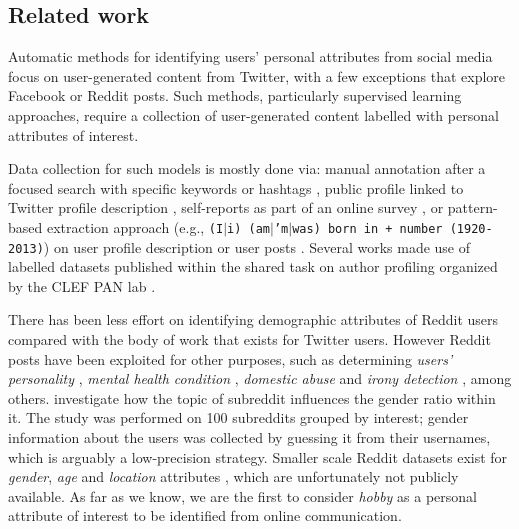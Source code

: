 \subsection{Related work}

Automatic methods for identifying users' personal attributes 
from social media focus on user-generated content from Twitter, with a few exceptions that explore Facebook \cite{sap:EMNLP14,Schwartz2013PersonalityGA} or Reddit \cite{fabian2015privacy,finlay2014age,gjurkovic-EtAl:2018} posts.
Such methods, particularly supervised learning approaches, require a collection of user-generated content labelled with personal attributes of interest.

Data collection for such models is mostly done via: manual annotation after a focused search with specific keywords or hashtags \cite{pietro:ACL15,Rao:2010}, public profile linked to Twitter profile description \cite{burger:EMNLP11,flekova:ACL16:long}, self-reports as part of an online survey \cite{finlay2014age,flekova:ACL16:long,pietro:ACL17:long,pietro:COLING18,sap:EMNLP14,schwartz2013personality}, or pattern-based extraction approach 
(e.g., \texttt{\small(I$|$i) (am$|$'m$|$was) born in + number (1920-2013)}) on user profile description or user posts \cite{fabian2015privacy,kim:ACL17:short,sloan2015tweets,tigunova2019listening}.
Several works \cite{basile:2017,bayot:MOD17} made use of labelled datasets published within the shared task on author profiling organized by the CLEF PAN lab \cite{stein:2017o,stein:2017l}. 

There has been less effort on identifying demographic attributes of Reddit users compared with the body of work that exists for Twitter users. However Reddit posts have been exploited for other purposes, such as determining \emph{users' personality} \cite{gjurkovic-EtAl:2018}, \emph{mental health condition} \cite{cohan2018smhd}, \emph{domestic abuse} \cite{schrading2015analysis} and \emph{irony detection} \cite{wallace2014humans}, among others.
\citet{thelwall2018she} investigate how the topic of subreddit influences the gender ratio within it. The study was performed on 100 subreddits grouped by interest; gender information about the users was collected by guessing it from their usernames, which is arguably a low-precision strategy. Smaller scale Reddit datasets exist for \emph{gender}, \emph{age} and \emph{location} attributes \cite{fabian2015privacy,finlay2014age}, which are unfortunately not publicly available. As far as we know, we are the first to consider \textit{hobby} as a personal attribute of interest to be identified from online communication.

